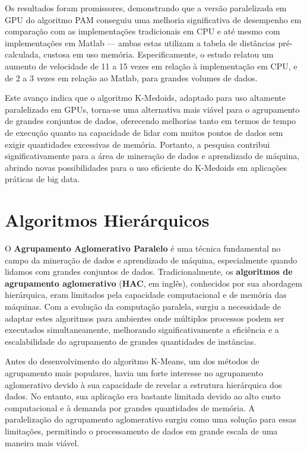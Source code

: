 \documentclass[12pt,
openright, 
oneside, %
a4paper,    %
brazil]{facom-ufu-abntex2}
\begin{document}
Os resultados foram promissores, demonstrando que a versão paralelizada em GPU do algoritmo PAM conseguiu uma melhoria significativa de desempenho em comparação com as implementações tradicionais em CPU e até mesmo com implementações em Matlab --- ambas estas utilizam a tabela de distâncias pré-calculada, custosa em uso memória. Especificamente, o estudo relatou um aumento de velocidade de 11 a 15 vezes em relação à implementação em CPU, e de 2 a 3 vezes em relação ao Matlab, para grandes volumes de dados.

Este avanço indica que o algoritmo K-Medoids, adaptado para uso altamente paralelizado em GPUs, torna-se uma alternativa mais viável para o agrupamento de grandes conjuntos de dados, oferecendo melhorias tanto em termos de tempo de execução quanto na capacidade de lidar com muitos pontos de dados sem exigir quantidades excessivas de memória. Portanto, a pesquisa contribui significativamente para a área de mineração de dados e aprendizado de máquina, abrindo novas possibilidades para o uso eficiente do K-Medoids em aplicações práticas de big data.




\section{Algoritmos Hierárquicos}

O \textbf{Agrupamento Aglomerativo Paralelo} é uma técnica fundamental no campo da mineração de dados e aprendizado de máquina, especialmente quando lidamos com grandes conjuntos de dados. Tradicionalmente, os \textbf{algoritmos de agrupamento aglomerativo} (\textbf{HAC}, em inglês), conhecidos por sua abordagem hierárquica, eram limitados pela capacidade computacional e de memória das máquinas. Com a evolução da computação paralela, surgiu a necessidade de adaptar estes algoritmos para ambientes onde múltiplos processos podem ser executados simultaneamente, melhorando significativamente a eficiência e a escalabilidade do agrupamento de grandes quantidades de instâncias.

Antes do desenvolvimento do algoritmo K-Means, um dos métodos de agrupamento mais populares, havia um forte interesse no agrupamento aglomerativo devido à sua capacidade de revelar a estrutura hierárquica dos dados. No entanto, sua aplicação era bastante limitada devido ao alto custo computacional e à demanda por grandes quantidades de memória. A paralelização do agrupamento aglomerativo surgiu como uma solução para essas limitações, permitindo o processamento de dados em grande escala de uma maneira mais viável.
\end{document}
